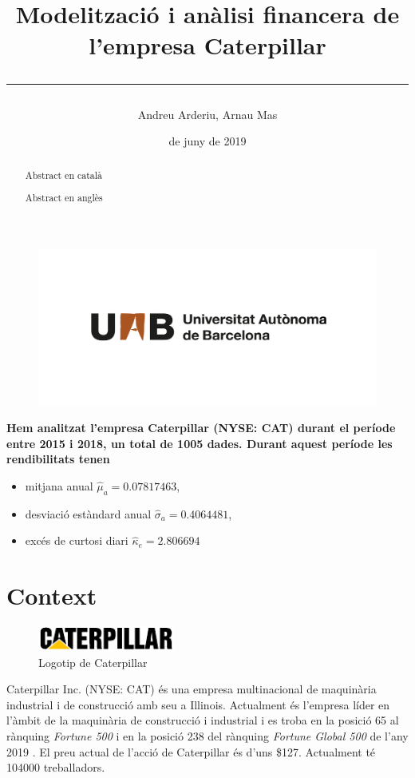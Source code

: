 \documentclass{article}
\title{\sffamily \bfseries Modelització i anàlisi financera de l'empresa Caterpillar \vspace{1em} \hrule}
\author{\sffamily Andreu Arderiu, Arnau Mas}
\date{\sffamily 14 de juny de 2019}
\numberwithin{table}{section}
\numberwithin{figure}{section}
\numberwithin{equation}{section}
\begin{document}
\begin{titlepage}
	\clearpage
	\thispagestyle{empty}
	\maketitle	

	\renewcommand{\abstractname}{\bfseries \sffamily Resum:}
	\begin{abstract}
		Abstract en català
	\end{abstract}

	\renewcommand{\abstractname}{\bfseries \sffamily Abstract:}
	\begin{abstract}
		Abstract en anglès
	\end{abstract}

	\begin{figure}[b]
		\thispagestyle{empty}
		\center \includegraphics[scale = 0.3]{uab}
	\end{figure}
\end{titlepage}

{\bfseries Hem analitzat l'empresa Caterpillar (NYSE: CAT) durant el període entre 2015 i 2018, un total de 1005 dades. Durant aquest període les rendibilitats tenen
	\begin{itemize}
		\item mitjana anual \( \hat{\mu}_a = \num{0.07817463}\),
		\item desviació estàndard anual \( \hat{\sigma}_a = \num{0.4064481} \),
		\item excés de curtosi diari \( \hat{\kappa}_e = 2.806694 \)
	\end{itemize}
}

\section{Context}
\begin{figure}[H]
	\centering \small \sffamily
	\includegraphics[width=0.4\textwidth]{cat-logo}
	\caption{Logotip de Caterpillar}
\end{figure} 
Caterpillar Inc. (NYSE: CAT) és una empresa multinacional de maquinària industrial i de construcció amb seu a Illinois. Actualment és l'empresa líder en l'àmbit de la maquinària de construcció i industrial \cite{cat} i es troba en la posició 65 al rànquing \emph{Fortune 500} i en la posició 238 del rànquing \emph{Fortune Global 500} de l'any 2019 \cite{fortune,global}. El preu actual de l'acció de Caterpillar és d'uns \$127. Actualment té \num{104000} treballadors. 
\end{document}
